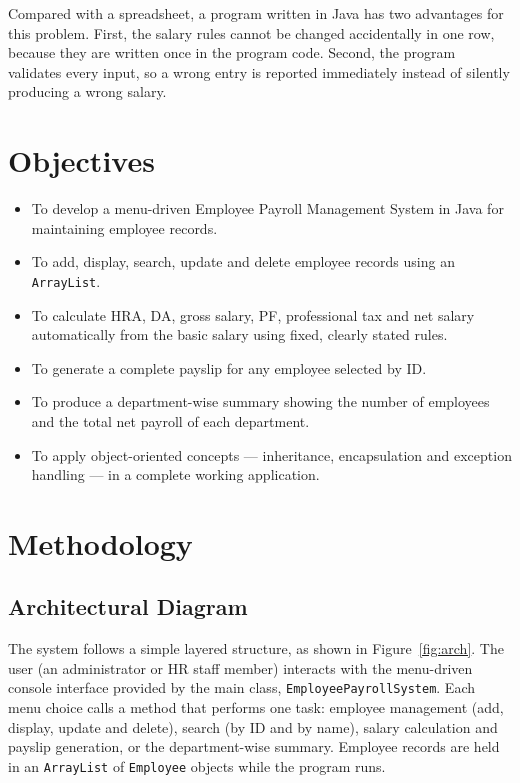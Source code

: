 \documentclass[11pt,a4paper]{article}
\begin{document}
Compared with a spreadsheet, a program written in Java has two
advantages for this problem. First, the salary rules cannot be changed
accidentally in one row, because they are written once in the program
code. Second, the program validates every input, so a wrong entry is
reported immediately instead of silently producing a wrong salary.

\section{Objectives}

\begin{itemize}
  \item To develop a menu-driven Employee Payroll Management System in
    Java for maintaining employee records.
  \item To add, display, search, update and delete employee records
    using an \texttt{ArrayList}.
  \item To calculate HRA, DA, gross salary, PF, professional tax and
    net salary automatically from the basic salary using fixed,
    clearly stated rules.
  \item To generate a complete payslip for any employee selected by ID.
  \item To produce a department-wise summary showing the number of
    employees and the total net payroll of each department.
  \item To apply object-oriented concepts --- inheritance,
    encapsulation and exception handling --- in a complete working
    application.
\end{itemize}

\section{Methodology}

\subsection{Architectural Diagram}

The system follows a simple layered structure, as shown in
Figure~\ref{fig:arch}. The user (an administrator or HR staff member)
interacts with the menu-driven console interface provided by the main
class, \texttt{EmployeePayrollSystem}. Each menu choice calls a
method that performs one task: employee management (add, display,
update and delete), search (by ID and by name), salary calculation
and payslip generation, or the department-wise summary. Employee
records are held in an \texttt{ArrayList} of \texttt{Employee}
objects while the program runs.
\end{document}
